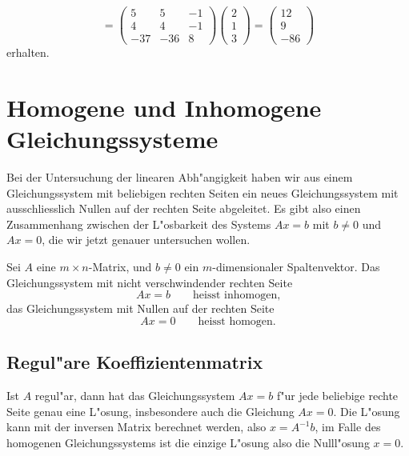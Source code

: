 \begin{beispiel}
\[=
\begin{pmatrix}
5&5&-1\\
4&4&-1\\
-37&-36&8
\end{pmatrix}
\begin{pmatrix}2\\1\\3\end{pmatrix}
=\begin{pmatrix}
12\\
9\\
-86
\end{pmatrix}
\]
erhalten.
\end{beispiel}

\section{Homogene und Inhomogene Gleichungssysteme}
Bei der Untersuchung der linearen Abh"angigkeit haben wir aus einem
Gleichungssystem mit beliebigen rechten Seiten ein neues Gleichungssystem
mit ausschliesslich Nullen auf der rechten Seite abgeleitet. Es gibt
also einen Zusammenhang zwischen der L"osbarkeit des Systems 
$Ax=b$ mit $b\ne 0$ und $Ax=0$, die wir jetzt genauer untersuchen
wollen.
\begin{definition}
Sei $A$ eine $m\times n$-Matrix, und $b\ne 0$ ein $m$-dimensionaler
Spaltenvektor. Das Gleichungssystem mit nicht verschwindender
rechten Seite
$$Ax=b\qquad\text{heisst inhomogen,}$$
das Gleichungssystem mit Nullen auf der rechten Seite 
$$Ax=0\qquad\text{heisst homogen.}$$
\end{definition}
\subsection{Regul"are Koeffizientenmatrix}
Ist $A$ regul"ar, dann hat das Gleichungssystem $Ax=b$ f"ur jede beliebige
rechte Seite genau eine L"osung, insbesondere auch die Gleichung $Ax=0$.
Die L"osung kann mit der inversen Matrix berechnet werden, also $x=A^{-1}b$,
im Falle des homogenen Gleichungssystems ist die einzige L"osung also
die Nulll"osung $x=0$.

